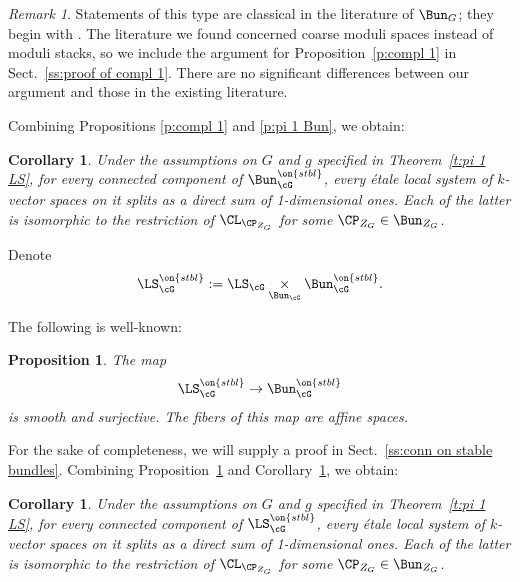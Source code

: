 \documentclass[9pt]{amsart}
\newtheorem{cor}[subsubsection]{Corollary}
\newtheorem{prop}[subsubsection]{Proposition}
\theoremstyle{remark}
\newtheorem{rem}[subsubsection]{Remark}
\theoremstyle{definition}
\theoremstyle{remark}
\newcommand{\thmref}[1]{Theorem~\ref{#1}}
\newcommand{\secref}[1]{Sect.~\ref{#1}}
\newcommand{\propref}[1]{Proposition~\ref{#1}}
\newcommand{\corref}[1]{Corollary~\ref{#1}}
\numberwithin{equation}{section}
\begin{document}
\begin{rem}

Statements of this type are classical in the 
literature of $\Bun_G$; they begin with \cite[Sect. 9]{NR}.
The literature we found concerned coarse moduli spaces instead
of moduli stacks, so we include the argument for
\propref{p:compl 1} in \secref{ss:proof of compl 1}.
There are no significant differences between our argument
and those in the existing literature.

\end{rem}

\sssec{}

Combining Propositions \ref{p:compl 1} and 
\ref{p:pi 1 Bun}, we obtain:

\begin{cor} \label{c:compl 1 Bun}
Under the assumptions on $G$ and $g$ specified in \thmref{t:pi 1 LS}, for 
every connected component of $\Bun_\cG^{\on{stbl}}$, every \'etale
local system of $k$-vector spaces on it splits as a direct sum of 1-dimensional ones. 
Each of the latter is isomorphic to the restriction of $\CL_{\CP_{Z_G}}$ for
some $\CP_{Z_G}\in \Bun_{Z_G}$.
\end{cor}

\sssec{}

Denote
$$\LS_\cG^{\on{stbl}}:=\LS_\cG\underset{\Bun_\cG}\times \Bun_\cG^{\on{stbl}}.$$

The following is well-known: 

\begin{prop} \label{p:conn on stable bundles}
The map 
$$\LS_\cG^{\on{stbl}}\to \Bun_\cG^{\on{stbl}}$$
is smooth and surjective. The fibers 
of this map are affine spaces.
\end{prop}

For the sake of completeness, we will supply a proof in \secref{ss:conn on stable bundles}. Combining \propref{p:conn on stable bundles}
and \corref{c:compl 1 Bun}, we obtain:

\begin{cor} \label{c:compl 1 LS}
Under the assumptions on $G$ and $g$ specified in \thmref{t:pi 1 LS}, for 
every connected component of $\LS_\cG^{\on{stbl}}$, every \'etale
local system of $k$-vector spaces on it splits as a direct sum of 1-dimensional ones. 
Each of the latter is isomorphic to the restriction of $\CL_{\CP_{Z_G}}$ for
some $\CP_{Z_G}\in \Bun_{Z_G}$.
\end{cor}

\sssec{Proof of \thmref{t:pi 1 LS}}
\end{document}
